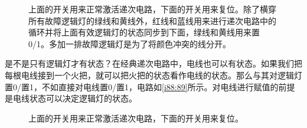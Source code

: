 \begin{figure}[!h]
\begin{center}
\end{center}
\caption{上面的开关用来正常激活递次电路，下面的开关用来复位。除了横穿所有故障逻辑灯的绿线和黄线外，红线和蓝线用来进行递次电路中的循环并将上面有效逻辑灯的状态同步到下面，绿线和黄线用来置0/1。多加一排故障逻辑灯是为了将颜色冲突的线分开。}
\label{i86:87}
\end{figure}

是不是只有逻辑灯才有状态？在经典递次电路中，电线也可以有状态。如果我们把每根电线接到一个火把，就可以把火把的状态看作电线的状态。那么与其对逻辑灯置0/置1，不如直接对电线置0/置1，电路如\autoref{i88:89}所示。对电线进行赋值的前提是电线状态可以决定逻辑灯的状态。

\begin{figure}[!h]
\begin{center}
\end{center}
\caption{上面的开关用来正常激活递次电路，下面的开关用来复位。}
\label{i88:89}
\end{figure}

